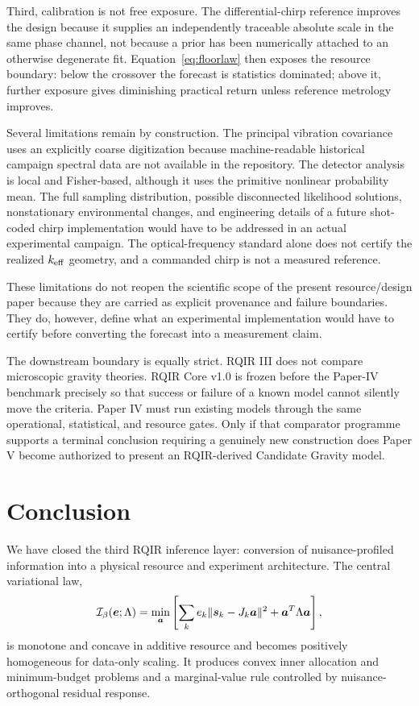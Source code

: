 Third, calibration is not free exposure. The differential-chirp reference improves the design because it supplies an independently traceable absolute scale in the same phase channel, not because a prior has been numerically attached to an otherwise degenerate fit. Equation~\eqref{eq:floorlaw} then exposes the resource boundary: below the crossover the forecast is statistics dominated; above it, further exposure gives diminishing practical return unless reference metrology improves.

Several limitations remain by construction. The principal vibration covariance uses an explicitly coarse digitization because machine-readable historical campaign spectral data are not available in the repository. The detector analysis is local and Fisher-based, although it uses the primitive nonlinear probability mean. The full sampling distribution, possible disconnected likelihood solutions, nonstationary environmental changes, and engineering details of a future shot-coded chirp implementation would have to be addressed in an actual experimental campaign. The optical-frequency standard alone does not certify the realized $k_{\rm eff}$ geometry, and a commanded chirp is not a measured reference.

These limitations do not reopen the scientific scope of the present resource/design paper because they are carried as explicit provenance and failure boundaries. They do, however, define what an experimental implementation would have to certify before converting the forecast into a measurement claim.

The downstream boundary is equally strict. RQIR III does not compare microscopic gravity theories. RQIR Core v1.0 is frozen before the Paper-IV benchmark precisely so that success or failure of a known model cannot silently move the criteria. Paper IV must run existing models through the same operational, statistical, and resource gates. Only if that comparator programme supports a terminal conclusion requiring a genuinely new construction does Paper V become authorized to present an RQIR-derived Candidate Gravity model.

\section{Conclusion}
\label{sec:conclusion}

We have closed the third RQIR inference layer: conversion of nuisance-profiled information into a physical resource and experiment architecture. The central variational law,
\begin{equation}
\mathcal I_{\beta}(\bm e;\Lambda)=\min_{\bm a}\left[\sum_k e_k\|\bm s_k-J_k\bm a\|^2+\bm a^T\Lambda\bm a\right],
\end{equation}
is monotone and concave in additive resource and becomes positively homogeneous for data-only scaling. It produces convex inner allocation and minimum-budget problems and a marginal-value rule controlled by nuisance-orthogonal residual response.

